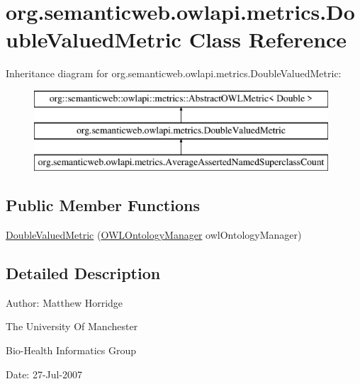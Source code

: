 \hypertarget{classorg_1_1semanticweb_1_1owlapi_1_1metrics_1_1_double_valued_metric}{\section{org.\-semanticweb.\-owlapi.\-metrics.\-Double\-Valued\-Metric Class Reference}
\label{classorg_1_1semanticweb_1_1owlapi_1_1metrics_1_1_double_valued_metric}
}
Inheritance diagram for org.\-semanticweb.\-owlapi.\-metrics.\-Double\-Valued\-Metric\-:\begin{figure}[H]
\begin{center}
\leavevmode
\includegraphics[height=3.000000cm]{classorg_1_1semanticweb_1_1owlapi_1_1metrics_1_1_double_valued_metric}
\end{center}
\end{figure}
\subsection*{Public Member Functions}
\begin{DoxyCompactItemize}
\item 
\hyperlink{classorg_1_1semanticweb_1_1owlapi_1_1metrics_1_1_double_valued_metric_a24884161e65b3f3ba7be776f081e4942}{Double\-Valued\-Metric} (\hyperlink{interfaceorg_1_1semanticweb_1_1owlapi_1_1model_1_1_o_w_l_ontology_manager}{O\-W\-L\-Ontology\-Manager} owl\-Ontology\-Manager)
\end{DoxyCompactItemize}


\subsection{Detailed Description}
Author\-: Matthew Horridge\par
 The University Of Manchester\par
 Bio-\/\-Health Informatics Group\par
 Date\-: 27-\/\-Jul-\/2007\par
\par
 

